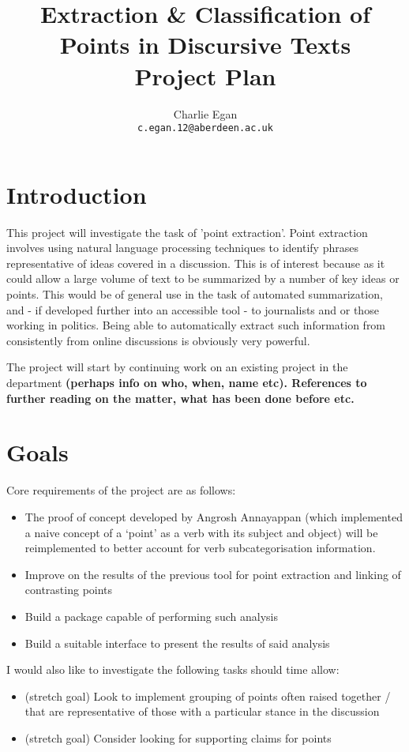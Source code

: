 \documentclass[tikz]{article}
\begin{document}
  \title{Extraction \& Classification of Points in Discursive Texts\\ Project Plan}
  \author{Charlie Egan \\ \texttt{c.egan.12@aberdeen.ac.uk}}

  \maketitle

  \section{Introduction}
    This project will investigate the task of 'point extraction'. Point extraction involves using natural language processing techniques to identify phrases representative of ideas covered in a discussion. This is of interest because as it could allow a large volume of text to be summarized by a number of key ideas or points. This would be of general use in the task of automated summarization, and - if developed further into an accessible tool - to journalists and or those working in politics. Being able to automatically extract such information from consistently from online discussions is obviously very powerful.

    The project will start by continuing work on an existing project in the department \textbf{(perhaps info on who, when, name etc). References to further reading on the matter, what has been done before etc.}

  \section{Goals}
    Core requirements of the project are as follows:
    \begin{itemize}
      \item{The proof of concept developed by Angrosh Annayappan (which implemented a naive concept of a `point' as a verb with its subject and object) will be reimplemented to better account for verb subcategorisation information.}
      \item{Improve on the results of the previous tool for point extraction and linking of contrasting points}
      \item{Build a package capable of performing such analysis}
      \item{Build a suitable interface to present the results of said analysis}
    \end{itemize}
    I would also like to investigate the following tasks should time allow:
    \begin{itemize}
      \item{(stretch goal) Look to implement grouping of points often raised together / that are representative of those with a particular stance in the discussion}
      \item{(stretch goal) Consider looking for supporting claims for points}
    \end{itemize}
\end{document}
